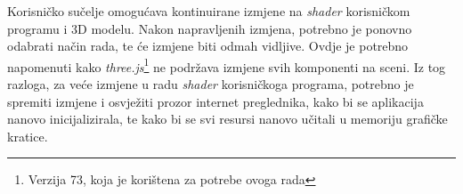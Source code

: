 Korisničko sučelje omogućava kontinuirane izmjene na \emph{shader} korisničkom programu i 3D modelu. Nakon napravljenih izmjena, potrebno je ponovno odabrati način rada, te će izmjene biti odmah vidljive. Ovdje je potrebno napomenuti kako \emph{three.js}\footnote{Verzija 73, koja je korištena za potrebe ovoga rada} ne podržava izmjene svih komponenti na sceni. Iz tog razloga, za veće izmjene u radu \emph{shader} korisničkoga programa, potrebno je spremiti izmjene i osvježiti prozor internet preglednika, kako bi se aplikacija nanovo inicijalizirala, te kako bi se svi resursi nanovo učitali u memoriju grafičke kratice.